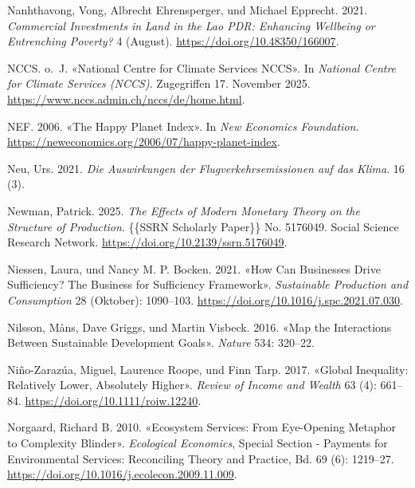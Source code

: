 \documentclass[
  nswissgerman,
  a4paper,
  openany]{book}
\newlength{\cslhangindent}
\newenvironment{CSLReferences}[2] %
 {\begin{list}{}{%
  \setlength{\itemindent}{0pt}
  \setlength{\leftmargin}{0pt}
  \setlength{\parsep}{0pt}
  \ifodd #1
   \setlength{\leftmargin}{\cslhangindent}
   \setlength{\itemindent}{-1\cslhangindent}
  \fi
  \setlength{\itemsep}{#2\baselineskip}}}
 {\end{list}}
\begin{document}
\begin{CSLReferences}{1}{1}
Nanhthavong, Vong, Albrecht Ehrensperger, und Michael Epprecht. 2021.
\emph{Commercial Investments in Land in the {Lao PDR}: {Enhancing}
Wellbeing or Entrenching Poverty?} 4 (August).
\url{https://doi.org/10.48350/166007}.

NCCS. o.~J. {«National {Centre} for {Climate} {Services} {NCCS}»}. In
\emph{National Centre for Climate Services (NCCS)}. Zugegriffen 17.
November 2025. \url{https://www.nccs.admin.ch/nccs/de/home.html}.

NEF. 2006. {«The {Happy} {Planet} {Index}»}. In \emph{New Economics
Foundation}. \url{https://neweconomics.org/2006/07/happy-planet-index}.

Neu, Urs. 2021. \emph{{Die Auswirkungen der Flugverkehrsemissionen auf
das Klima}}. 16 (3).

Newman, Patrick. 2025. \emph{The {Effects} of {Modern Monetary Theory}
on the {Structure} of {Production}}. \{\{SSRN Scholarly Paper\}\} No.
5176049. Social Science Research Network.
\url{https://doi.org/10.2139/ssrn.5176049}.

Niessen, Laura, und Nancy M. P. Bocken. 2021. {«How Can Businesses Drive
Sufficiency? {The} Business for Sufficiency Framework»}.
\emph{Sustainable Production and Consumption} 28 (Oktober): 1090--103.
\url{https://doi.org/10.1016/j.spc.2021.07.030}.

Nilsson, Måns, Dave Griggs, und Martin Visbeck. 2016. {«Map the
Interactions Between {Sustainable Development Goals}»}. \emph{Nature}
534: 320--22.

Niño-Zarazúa, Miguel, Laurence Roope, und Finn Tarp. 2017. {«Global
{Inequality}: {Relatively Lower}, {Absolutely Higher}»}. \emph{Review of
Income and Wealth} 63 (4): 661--84.
\url{https://doi.org/10.1111/roiw.12240}.

Norgaard, Richard B. 2010. {«Ecosystem Services: {From} Eye-Opening
Metaphor to Complexity Blinder»}. \emph{Ecological Economics}, Special
{Section} - {Payments} for {Environmental Services}: {Reconciling
Theory} and {Practice}, Bd. 69 (6): 1219--27.
\url{https://doi.org/10.1016/j.ecolecon.2009.11.009}.


\end{CSLReferences}
\end{document}
